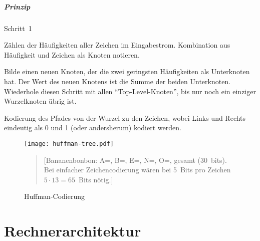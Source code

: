 \paragraph*{Prinzip}
\begin{labeling}{Schritt~1}
    \item [{\emph{Schritt~1}}]
        Zählen der Häufigkeiten aller Zeichen im Eingabestrom.
        Kombination aus Häufigkeit und Zeichen als Knoten notieren.
    \item [{\emph{Schritt~2}}]
        Bilde einen neuen Knoten, der die zwei geringsten Häuf\-ig\-keit\-en als Unterknoten hat.
        Der Wert des neuen Knotens ist die Summe der beiden Unterknoten.
        Wiederhole diesen Schritt mit allen \enquote{Top-Level-Knoten}, bis nur noch ein einziger Wurzelknoten übrig ist.
    \item [{\emph{Schritt~3}}]
        Kodierung des Pfades von der Wurzel zu den Zeichen, wobei Links und Rechts eindeutig als 0 und 1 (oder andersherum) kodiert werden.
\end{labeling}

\begin{figure}[htb]
\noindent\centering\texttt{[image: huffman-tree.pdf]}

\begin{quote}
    \small[Bananenbonbon: A=, B=, E=, N=, O=, gesamt  (30~bits).
Bei einfacher Zeichencodierung wären bei 5~Bits pro Zeichen $5\cdot13=65$~Bits nötig.]
\end{quote}

\caption{Huffman-Codierung}
\end{figure}


\chapter{ Rechnerarchitektur}



